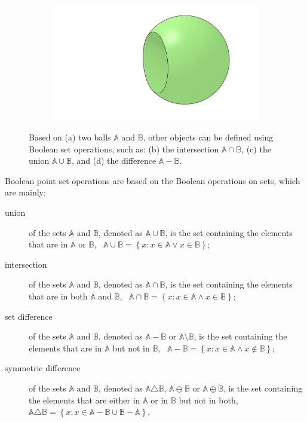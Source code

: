 \begin{figure}
\begin{subfigure}[b]{0.5\linewidth}
\caption{}%
\label{subfig:boolean-union}
\end{subfigure}%
\begin{subfigure}[b]{0.5\linewidth}
\includegraphics[width=\linewidth]{figs/boolean-difference}
\caption{}%
\label{subfig:boolean-difference}
\end{subfigure}
\caption{Based on (a) two balls \(\mathbb{A}\) and \(\mathbb{B}\), other objects can be defined using Boolean set operations, such as: (b) the intersection \(\mathbb{A} \cap \mathbb{B}\), (c) the union \(\mathbb{A} \cup \mathbb{B}\), and (d) the difference \(\mathbb{A} - \mathbb{B}\).}%
\label{fig:boolean}
\end{figure}

Boolean point set operations are based on the Boolean operations on sets, which are mainly:

\begin{description}
\item[union] of the sets \(\mathbb{A}\) and \(\mathbb{B}\), denoted as \(\mathbb{A} \cup \mathbb{B}\), is the set containing the elements that are in \(\mathbb{A}\) or \(\mathbb{B}\), \ie\ \( \mathbb{A} \cup \mathbb{B} = \left\{ x : x \in \mathbb{A} \vee x \in \mathbb{B} \right\} \);
\item[intersection] of the sets \(\mathbb{A}\) and \(\mathbb{B}\), denoted as \(\mathbb{A} \cap \mathbb{B}\), is the set containing the elements that are in both \(\mathbb{A}\) and \(\mathbb{B}\), \ie\ \( \mathbb{A} \cap \mathbb{B} = \left\{ x : x \in \mathbb{A} \wedge x \in \mathbb{B} \right\} \);
\item[set difference] of the sets \(\mathbb{A}\) and \(\mathbb{B}\), denoted as \(\mathbb{A} - \mathbb{B}\) or \(\mathbb{A} \setminus \mathbb{B}\), is the set containing the elements that are in \(\mathbb{A}\) but not in \(\mathbb{B}\), \ie\ \( \mathbb{A} - \mathbb{B} = \left\{ x : x \in \mathbb{A} \wedge x \notin \mathbb{B} \right\} \);
\item[symmetric difference] of the sets \(\mathbb{A}\) and \(\mathbb{B}\), denoted as \(\mathbb{A} \triangle \mathbb{B}\), \(\mathbb{A} \ominus \mathbb{B}\) or \(\mathbb{A} \oplus \mathbb{B}\), is the set containing the elements that are either in \(\mathbb{A}\) or in \(\mathbb{B}\) but not in both, \ie\ \( \mathbb{A} \triangle \mathbb{B} = \left\{ x : x \in \mathbb{A} - \mathbb{B} \cup \mathbb{B} - \mathbb{A} \right\} \).
\end{description}

